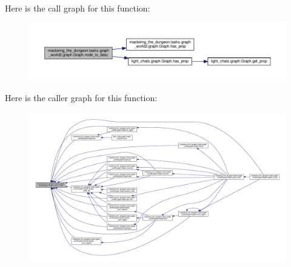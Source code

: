 Here is the call graph for this function\+:
\nopagebreak
\begin{figure}[H]
\begin{center}
\leavevmode
\includegraphics[width=350pt]{classmastering__the__dungeon_1_1tasks_1_1graph__world2_1_1graph_1_1Graph_adc2e8672dfe5637ef7f2bd5a2d9c9083_cgraph}
\end{center}
\end{figure}
Here is the caller graph for this function\+:
\nopagebreak
\begin{figure}[H]
\begin{center}
\leavevmode
\includegraphics[width=350pt]{classmastering__the__dungeon_1_1tasks_1_1graph__world2_1_1graph_1_1Graph_adc2e8672dfe5637ef7f2bd5a2d9c9083_icgraph}
\end{center}
\end{figure}
\mbox{\label{classmastering__the__dungeon_1_1tasks_1_1graph__world2_1_1graph_1_1Graph_a3d1c3b4c1ddc901d6b6d7dd59c9b1399}} 
